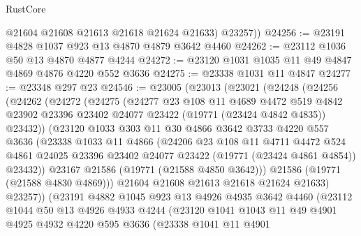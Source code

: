 \begin{lexlean}{RustCore}
\begin{coremodule}
          @21604
          @21608
          @21613
          @21618
          @21624
          @21633)
        @23257))
@24256 := @23191 @4828 @1037 @923 @13 @4870 @4879 @3642 @4460
@24262 := @23112 @1036 @50 @13 @4870 @4877 @4244
@24272 := @23120 @1031 @1035 @11 @49 @4847 @4869 @4876 @4220 @552 @3636
@24275 := @23338 @1031 @11 @4847
@24277 := @23348 @297 @23
@24546 := @23005
    (@23013
      (@23021
        (@24248
          (@24256
            (@24262
              (@24272
                (@24275
                  (@24277
                    @23
                    @108
                    @11
                    @4689
                    @4472
                    @519
                    @4842
                    @23902
                    @23396
                    @23402
                    @24077
                    @23422
                    (@19771 (@23424 @4842 @4835))
                    @23432))
                (@23120
                  @1033
                  @303
                  @11
                  @30
                  @4866
                  @3642
                  @3733
                  @4220
                  @557
                  @3636
                  (@23338
                    @1033
                    @11
                    @4866
                    (@24206
                      @23
                      @108
                      @11
                      @4711
                      @4472
                      @524
                      @4861
                      @24025
                      @23396
                      @23402
                      @24077
                      @23422
                      (@19771 (@23424 @4861 @4854))
                      @23432))
                  @23167
                  @21586
                  (@19771 (@21588 @4850 @3642)))
                @21586
                (@19771 (@21588 @4830 @4869)))
              @21604
              @21608
              @21613
              @21618
              @21624
              @21633)
            @23257))
        (@23191
          @4882
          @1045
          @923
          @13
          @4926
          @4935
          @3642
          @4460
          (@23112
            @1044
            @50
            @13
            @4926
            @4933
            @4244
            (@23120
              @1041
              @1043
              @11
              @49
              @4901
              @4925
              @4932
              @4220
              @595
              @3636
              (@23338
                @1041
                @11
                @4901

\end{coremodule}
\end{lexlean}
